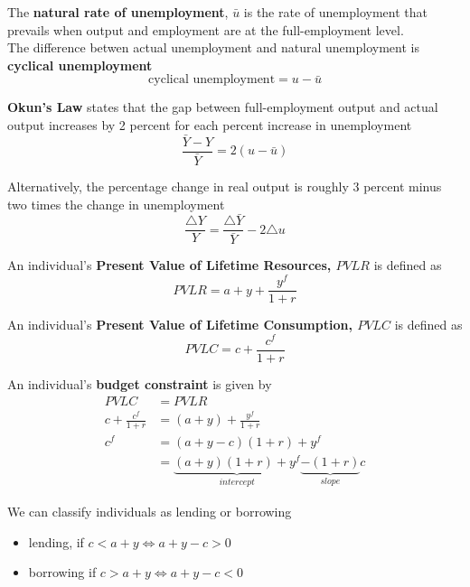 \documentclass[letterpaper, 9pt,landscape]{extarticle}
\begin{document}
\begin{multicols*}{5}
\begin{definition}
    The \textbf{natural rate of unemployment}, $ \bar{u} $ is the rate of unemployment that prevails when output and employment are at the full-employment level. \\

    The difference betwen actual unemployment and natural unemployment is \textbf{cyclical unemployment} 
    \[
    \text{cyclical unemployment}= u - \bar{u} 
    \]
\end{definition}

\begin{theorem}
    \textbf{Okun's Law} states that the gap between full-employment output and actual output increases by 2 percent for each percent increase in unemployment 
    \[
    \frac{\bar{Y} - Y }{\bar{Y} } = 2 \left( u  - \bar{u}  \right) 
    \]

    Alternatively, the percentage change in real output is roughly 3 percent minus two times the change in unemployment
    \[
    \frac{\triangle Y}{Y} = \frac{\triangle \bar{Y} }{ \bar{Y} }  - 2 \triangle u
    \]
\end{theorem}


\begin{definition}
    An individual's \textbf{Present Value of Lifetime Resources, $PVLR$} is defined as 
    \[
        PVLR = a + y + \frac{y^f}{1 + r}
    \]
\end{definition}

\begin{definition}
    An individual's \textbf{Present Value of Lifetime Consumption, $PVLC$} is defined as 
    \[
        PVLC = c + \frac{c^f}{1 + r}
    \]
\end{definition}



\begin{definition}
    An individual's \textbf{budget constraint} is given by
    \begin{align*}
        PVLC &= PVLR \\
        c + \frac{c^f}{1 + r} &= (a + y) + \frac{y^f}{1+r} \\
        c^f &= (a + y - c) (1 + r) + y^f \\
        &= \underbrace{(a + y)(1 + r)+ y^f}_{intercept}   \underbrace{ - (1+r)}_{slope} c 
    \end{align*}
\end{definition}

\begin{remark}
    We can classify individuals as lending or borrowing 
    \begin{itemize}
        \item lending, if $c < a + y \iff a + y - c > 0$
        \item borrowing if $c > a + y \iff a + y - c < 0$
    \end{itemize} 
\end{remark}



\end{multicols*}
\end{document}
